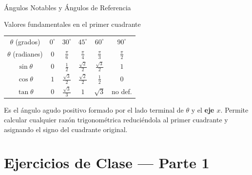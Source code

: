 \documentclass[aspectratio=169]{beamer}
\begin{document}
\begin{frame}{Ángulos Notables y Ángulos de Referencia}
  \begin{block}{Valores fundamentales en el primer cuadrante}
    \begin{center}
      \small
      \begin{tabular}{cccccc}
        \toprule
        $\theta$ (grados) & $0^\circ$ & $30^\circ$ & $45^\circ$ & $60^\circ$ & $90^\circ$ \\
        $\theta$ (radianes) & $0$ & $\frac{\pi}{6}$ & $\frac{\pi}{4}$ & $\frac{\pi}{3}$ & $\frac{\pi}{2}$ \\
        \midrule
        $\sin\theta$ & $0$ & $\frac{1}{2}$ & $\frac{\sqrt{2}}{2}$ & $\frac{\sqrt{3}}{2}$ & $1$ \\
        $\cos\theta$ & $1$ & $\frac{\sqrt{3}}{2}$ & $\frac{\sqrt{2}}{2}$ & $\frac{1}{2}$ & $0$ \\
        $\tan\theta$ & $0$ & $\frac{\sqrt{3}}{3}$ & $1$ & $\sqrt{3}$ & no def. \\
        \bottomrule
      \end{tabular}
    \end{center}
  \end{block}

  \vspace{4pt}
  \begin{mwextra}
    Es el ángulo agudo positivo formado por el lado terminal de $\theta$ y el \textbf{eje $x$}. Permite calcular cualquier razón trigonométrica reduciéndola al primer cuadrante y asignando el signo del cuadrante original.
  \end{mwextra}
\end{frame}



\section{Ejercicios de Clase — Parte 1}
\end{document}
